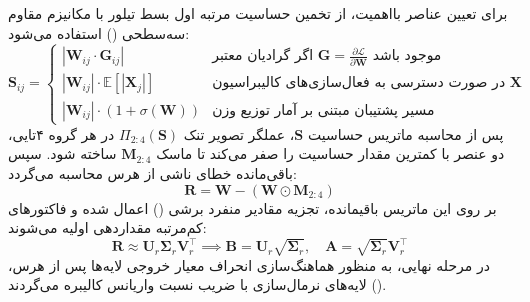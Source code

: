 برای تعیین عناصر بااهمیت، از تخمین حساسیت مرتبه اول بسط تیلور با مکانیزم مقاوم سه‌سطحی () استفاده می‌شود:
\begin{equation}
\mathbf{S}_{ij} =
\begin{cases}
|\mathbf{W}_{ij} \cdot \mathbf{G}_{ij}| & \text{اگر گرادیان معتبر } \mathbf{G} = \frac{\partial \mathcal{L}}{\partial \mathbf{W}} \text{ موجود باشد} \\
|\mathbf{W}_{ij}| \cdot \mathbb{E}[|\mathbf{X}_j|] & \text{در صورت دسترسی به فعال‌سازی‌های کالیبراسیون } \mathbf{X} \\
|\mathbf{W}_{ij}| \cdot (1 + \sigma(\mathbf{W})) & \text{مسیر پشتیبان مبتنی بر آمار توزیع وزن}
\end{cases}
\end{equation}
پس از محاسبه ماتریس حساسیت $\mathbf{S}$، عملگر تصویر تنک $\Pi_{2:4}(\mathbf{S})$ در هر گروه ۴‌تایی، دو عنصر با کمترین مقدار حساسیت را صفر می‌کند تا ماسک $\mathbf{M}_{2:4}$ ساخته شود. سپس باقی‌مانده خطای ناشی از هرس محاسبه می‌گردد:
\begin{equation}
\mathbf{R} = \mathbf{W} - (\mathbf{W} \odot \mathbf{M}_{2:4})
\end{equation}
بر روی این ماتریس باقیمانده، تجزیه مقادیر منفرد برشی () اعمال شده و فاکتورهای کم‌مرتبه مقداردهی اولیه می‌شوند:
\begin{equation}
\mathbf{R} \approx \mathbf{U}_r \mathbf{\Sigma}_r \mathbf{V}_r^\top \implies \mathbf{B} = \mathbf{U}_r \sqrt{\mathbf{\Sigma}_r}, \quad \mathbf{A} = \sqrt{\mathbf{\Sigma}_r} \mathbf{V}_r^\top
\end{equation}
در مرحله نهایی، به منظور هماهنگ‌سازی انحراف معیار خروجی لایه‌ها پس از هرس، لایه‌های نرمال‌سازی با ضریب نسبت واریانس کالیبره می‌گردند ().

